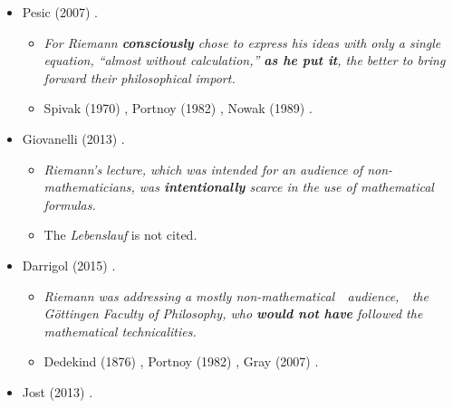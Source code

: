 \documentclass[12pt]{article}
\begin{document}
\begin{itemize}
\begin{itemize}
\item[$\bullet$]Dedekind (1876) \cite{Dedekind1876b}.

\end{itemize}

\item[$\bullet$]Pesic (2007) \cite{Pesic2007}.

\begin{itemize}

\item[]{\it For Riemann {\bf con­sciously} chose to express his ideas with only a single equation, ``almost without calculation,'' {\bf as he put it}, the better to bring forward their philosophical import.}

\item[$\bullet$]Spivak (1970) \cite{Spivak1970}, Portnoy (1982) \cite{Portnoy1982}, Nowak (1989) \cite{Nowak1989}.

\end{itemize}

\item[$\bullet$]Giovanelli (2013) \cite{Giovanelli2013}.

\begin{itemize}

\item[]{\it Riemann's lecture, which was intended for an audience of non-mathema\-ticians, was {\bf intentionally} scarce in the use of mathematical formulas.}

\item[$\bullet$]The {\it Lebenslauf} is not cited.

\end{itemize}

\item[$\bullet$]Darrigol (2015) \cite{Darrigol2015}.

\begin{itemize}

\item[]{\it Riemann was addressing a mostly non-mathematical\ \ audience,\ \ the G\"ottingen Faculty of Philosophy, who {\bf would not have} followed the mathematical technicalities.}

\item[$\bullet$]Dedekind (1876) \cite{Dedekind1876b}, Portnoy (1982) \cite{Portnoy1982}, Gray (2007) \cite{Gray2007}.

\end{itemize}

\item[$\bullet$]Jost (2013) \cite{Jost2013}.


\end{itemize}
\end{document}

